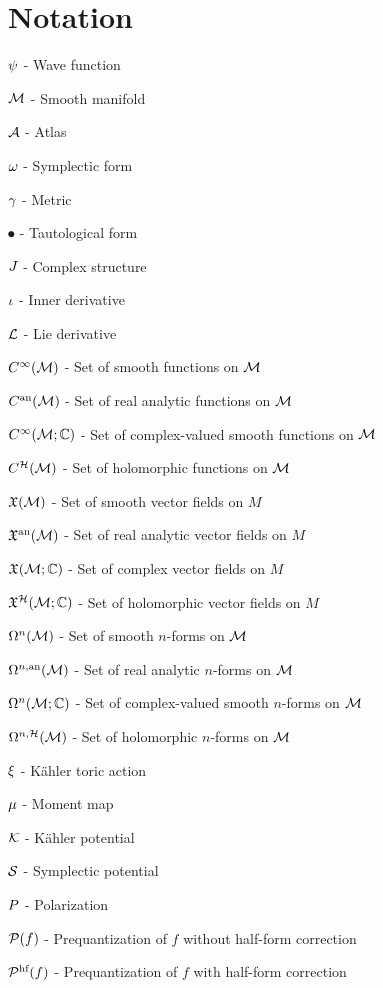 \documentclass[notas.tex]{subfiles}
\begin{document}
	\chapter*{Notation}
	$\psi$ - Wave function

	$\mathcal{M}$ - Smooth manifold

	$\mathcal{A}$ - Atlas

	$\omega$ - Symplectic form

	$\gamma$ - Metric

	$\spot$ - Tautological form

	$J$ - Complex structure

	$\iota$ - Inner derivative

	$\mathcal{L}$ - Lie derivative

	$C^\infty(\mathcal{M})$ - Set of smooth functions on $\mathcal{M}$

	$C^{\text{an}}(\mathcal{M})$ - Set of real analytic functions on $\mathcal{M}$

	$C^\infty(\mathcal{M}; \mathbb{C})$ - Set of complex-valued smooth functions on $\mathcal{M}$

	$C^{\mathcal{H}}(\mathcal{M})$ - Set of holomorphic functions on $\mathcal{M}$

	$\mathfrak{X}(\mathcal{M})$ - Set of smooth vector fields on $M$

	$\mathfrak{X}^{\text{an}}(\mathcal{M})$ - Set of real analytic vector fields on $M$

	$\mathfrak{X}(\mathcal{M}; \mathbb{C})$ - Set of complex vector fields on $M$

	$\mathfrak{X}^{\mathcal{H}}(\mathcal{M}; \mathbb{C})$ - Set of  holomorphic vector fields on $M$

	$\Omega^n(\mathcal{M})$ - Set of smooth $n$-forms on $\mathcal{M}$
	
	$\Omega^{n, \text{an}}(\mathcal{M})$ - Set of real analytic $n$-forms on $\mathcal{M}$
	
	$\Omega^{n}(\mathcal{M}; \mathbb{C})$ - Set of complex-valued smooth $n$-forms on $\mathcal{M}$
	
	$\Omega^{n, \mathcal{H}}(\mathcal{M})$ - Set of holomorphic $n$-forms on $\mathcal{M}$
	
	$\xi$ - Kähler toric action

	$\mu$ - Moment map

	$\mathcal{K}$ - Kähler potential

	$\mathcal{S}$ - Symplectic potential
	
	$P$ - Polarization

	$\mathcal{P}(f)$ - Prequantization of $f$ without half-form correction

	$\mathcal{\mathcal{P}^\text{hf}}(f)$ - Prequantization of $f$ with half-form correction
\end{document}
